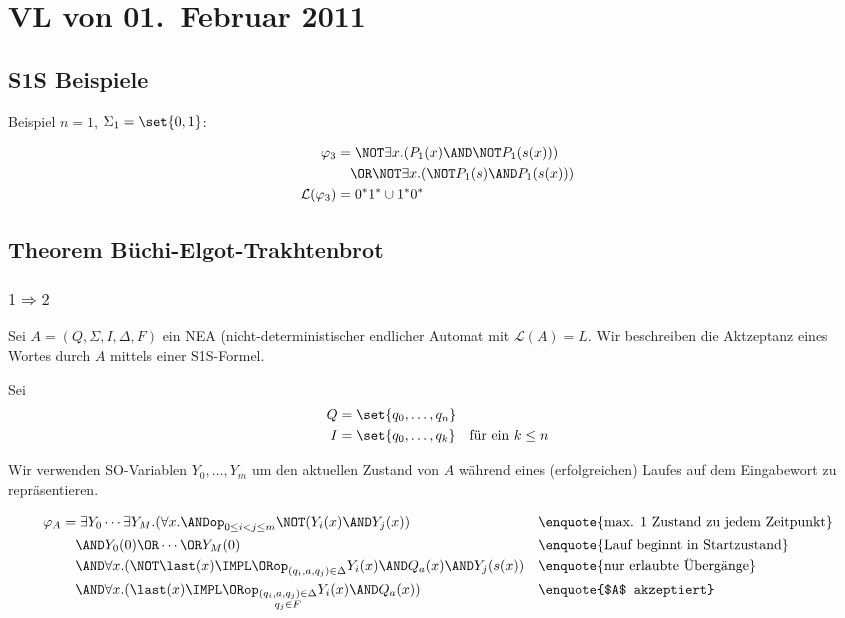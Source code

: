 \section{VL von 01.~Februar 2011}

\subsection{S1S Beispiele}

Beispiel $n=1$, $\Sigma_1=\set{0,1}$:

\begin{align*}
  \varphi_3 &= \NOT\exists x.(P_1(x)\AND\NOT P_1(s(x))) \\
    &\quad \OR \NOT\exists x.(\NOT P_1(s)\AND P_1(s(x))) \\
  \mathcal{L}(\varphi_3) &= 0^*1^* \cup 1^*0^* \\
\end{align*}

\subsection{Theorem Büchi-Elgot-Trakhtenbrot}

\subsubsection{$1\Rightarrow 2$}

Sei $A=(Q,\Sigma,I,\Delta,F)$ ein NEA (nicht-deterministischer endlicher
Automat mit $\mathcal{L}(A)=L$. Wir beschreiben die Aktzeptanz eines Wortes
durch $A$ mittels einer S1S-Formel.

Sei
\begin{align*}
  Q &= \set{q_0,\dots,q_n}\\
  I &= \set{q_0,\dots,q_k} \quad\text{für ein $k\leq n$}\\
\end{align*}

Wir verwenden SO-Variablen $Y_0,\dots,Y_m$ um den aktuellen Zustand von
$A$ während eines (erfolgreichen) Laufes auf dem Eingabewort zu
repräsentieren.

\begin{align*}
  \varphi_A &= \exists Y_0 \cdots \exists Y_M.(\forall x. \ANDop_{0\leq i<j\leq m} \NOT(Y_i(x)\AND Y_j(x)) && \text{\enquote{max. 1 Zustand zu jedem Zeitpunkt}} \\
    &\quad \AND Y_0(0)\OR\cdots\OR Y_M(0) && \text{\enquote{Lauf beginnt in Startzustand}} \\
    &\quad \AND \forall x.(\NOT\last(x) \IMPL \ORop_{(q_i,a,q_j)\in\Delta} Y_i(x) \AND Q_a(x) \AND Y_j(s(x)) && \text{\enquote{nur erlaubte Übergänge}} \\
    &\quad \AND \forall x.(\last(x)\IMPL\ORop_{\substack{(q_i,a,q_j)\in\Delta\\ q_j\in F}} Y_i(x)\AND Q_a(x)) && \text{\enquote{$A$ akzeptiert}}
\end{align*}

